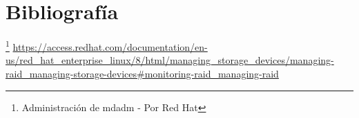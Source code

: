\newpage
\section{Bibliografía}

\footnote{Administración de mdadm - Por Red Hat}
\textcolor{blue}{\url{https://access.redhat.com/documentation/en-us/red_hat_enterprise_linux/8/html/managing_storage_devices/managing-raid_managing-storage-devices#monitoring-raid_managing-raid}}

